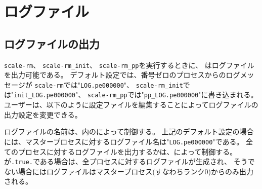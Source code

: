 \section{ログファイル} \label{sec:log}


\subsection{ログファイルの出力}

\verb|scale-rm|、 \verb|scale-rm_init|、 \verb|scale-rm_pp|を実行するときに、
\scalerm はログファイルを出力可能である。
デフォルト設定では、番号ゼロのプロセスからのログメッセージが
\verb|scale-rm|では"\verb|LOG.pe000000|"、 
 \verb|scale-rm_init|では"\verb|init_LOG.pe000000|"、
\verb|scale-rm_pp|では"\verb|pp_LOG.pe000000|"に書き込まれる。
ユーザーは、以下のように設定ファイルを編集することによってログファイルの出力設定を変更できる。


ログファイルの名前は、内のによって制御する。
上記のデフォルト設定の場合には、マスタープロセスに対するログファイル名は"\verb|LOG.pe000000|"である。
全てのプロセスに対するログファイルを出力するかは、によって制御する。
が\verb|.true.|である場合は、全プロセスに対するログファイルが生成され、
そうでない場合にはログファイルはマスタープロセス(すなわちランク0)からのみ出力される。

